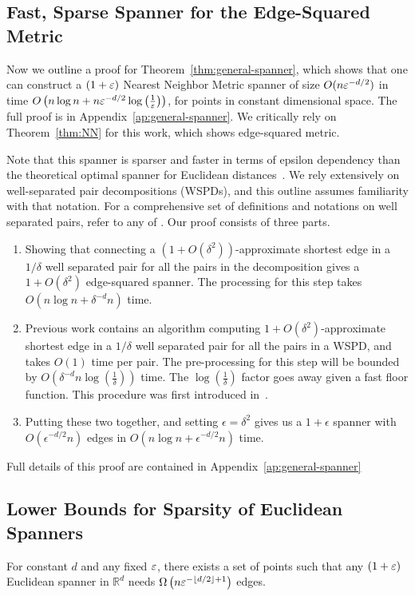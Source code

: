 \subsection{Fast, Sparse Spanner for the Edge-Squared
Metric}
\label{sec:general-spanner}

Now we outline a proof for Theorem~\ref{thm:general-spanner}, which shows
that one can construct a $(1+\varepsilon)$ Nearest Neighbor Metric spanner of size
$O(n \varepsilon^{-d/2})$ in
time $O\left(n \log n + n \varepsilon^{-d/2} \log \left(\frac{1}{\varepsilon}\right)\right)$, 
for points in constant dimensional space. The full proof is in
Appendix~\ref{ap:general-spanner}. We critically rely on
Theorem~\ref{thm:NN} for this work, which shows
edge-squared metric.

Note that this spanner is sparser and faster in terms of epsilon dependency
than the theoretical optimal spanner for Euclidean distances~\cite{}.
We rely extensively on well-separated pair decompositions
(WSPDs),
and this outline assumes familiarity with that notation.
For a comprehensive set of definitions and notations on well separated
pairs, refer to any of \cite{Callahan1995, Arya2016, Callahan1993,
arya95euclid}.  
Our proof consists of three parts.
\begin{enumerate}
\item Showing that connecting a $(1+O(\delta^2))$-approximate shortest edge
in a $1/\delta$ well separated pair for all the pairs in the decomposition
gives a $1+O(\delta^2)$ edge-squared spanner.
The processing for this step takes $O(n \log n + \delta^{-d}n)$ time.
\item Previous work contains an algorithm computing
  $1+O(\delta^2)$-approximate shortest edge in a $1/\delta$ well
    separated pair for all the pairs in a WSPD, and takes
    $O(1)$ time per pair. The pre-processing for this step will be
    bounded by $O(\delta^{-d}n\log\left(\frac{1}{\delta}\right))$ time. The $\log\left(\frac{1}{\delta}\right)$ factor goes away given a fast floor function. 
    This procedure was first introduced in~\cite{Callahan1995}.

\item Putting these two together, and setting $\epsilon = \delta^2$
gives us a $1+\epsilon$ spanner with
$O(\epsilon^{-d/2}n)$ edges in
    $O(n \log n + \epsilon^{-d/2}n)$ time.
\end{enumerate}
Full details of this proof are contained in Appendix~\ref{ap:general-spanner}

\subsection{Lower Bounds for Sparsity of Euclidean
Spanners}\label{sec:lower-bound}
\begin{theorem} \label{thm:euc} For constant $d$ and any fixed $\varepsilon$, there exists a set
of points such that any $(1+\varepsilon)$ Euclidean spanner in $\mathbb{R}^d$
  needs $\Omega\left(n
  \varepsilon^{-\lfloor d/2\rfloor + 1}\right)$ edges.
\end{theorem}
